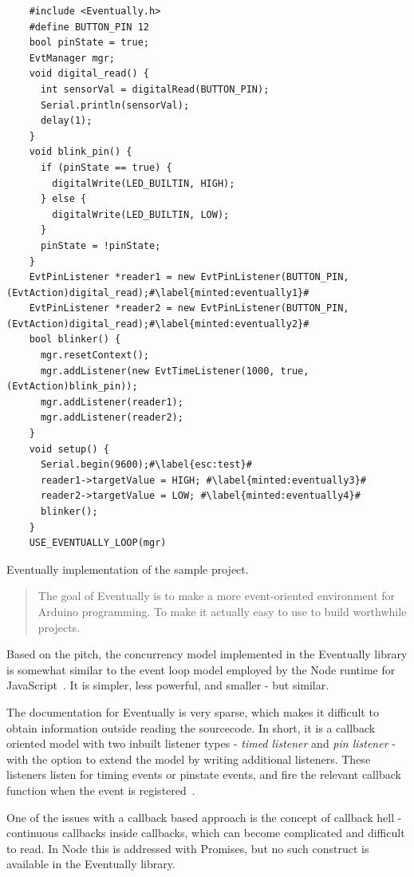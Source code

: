\begin{listing}[htb!]
  \begin{verbatim}
    #include <Eventually.h>
    #define BUTTON_PIN 12
    bool pinState = true;
    EvtManager mgr;
    void digital_read() {
      int sensorVal = digitalRead(BUTTON_PIN);
      Serial.println(sensorVal);
      delay(1);
    }
    void blink_pin() {
      if (pinState == true) {
        digitalWrite(LED_BUILTIN, HIGH);
      } else {
        digitalWrite(LED_BUILTIN, LOW);
      }
      pinState = !pinState;
    }
    EvtPinListener *reader1 = new EvtPinListener(BUTTON_PIN, (EvtAction)digital_read);#\label{minted:eventually1}#
    EvtPinListener *reader2 = new EvtPinListener(BUTTON_PIN, (EvtAction)digital_read);#\label{minted:eventually2}#
    bool blinker() {
      mgr.resetContext();
      mgr.addListener(new EvtTimeListener(1000, true, (EvtAction)blink_pin));
      mgr.addListener(reader1);
      mgr.addListener(reader2);
    }
    void setup() {
      Serial.begin(9600);#\label{esc:test}#
      reader1->targetValue = HIGH; #\label{minted:eventually3}#
      reader2->targetValue = LOW; #\label{minted:eventually4}#
      blinker();
    }
    USE_EVENTUALLY_LOOP(mgr)
  \end{verbatim}
  \caption{Eventually implementation of the sample project.}
  \label{lst:eventuallyexample}
\end{listing}


\blockcquote{bartlettEventually2022Bartlett}{The goal of Eventually is to make a more event-oriented environment for Arduino programming. To make it actually easy to use to build worthwhile projects.}

Based on the pitch, the concurrency model implemented in the Eventually library is somewhat similar to the event loop model employed by the Node runtime for JavaScript~\cite{NodeJSdocs}. It is simpler, less powerful, and smaller - but similar.

The documentation for Eventually is very sparse, which makes it difficult to obtain information outside reading the sourcecode. In short, it is a callback oriented model with two inbuilt listener types - \textit{timed listener} and \textit{pin listener} - with the option to extend the model by writing additional listeners. These listeners listen for timing events or pinstate events, and fire the relevant callback function when the event is registered~\cite{bartlettEventually2022Bartlett}.

One of the issues with a callback based approach is the concept of callback hell - continuous callbacks inside callbacks, which can become complicated and difficult to read. In Node this is addressed with Promises, but no such construct is available in the Eventually library.

